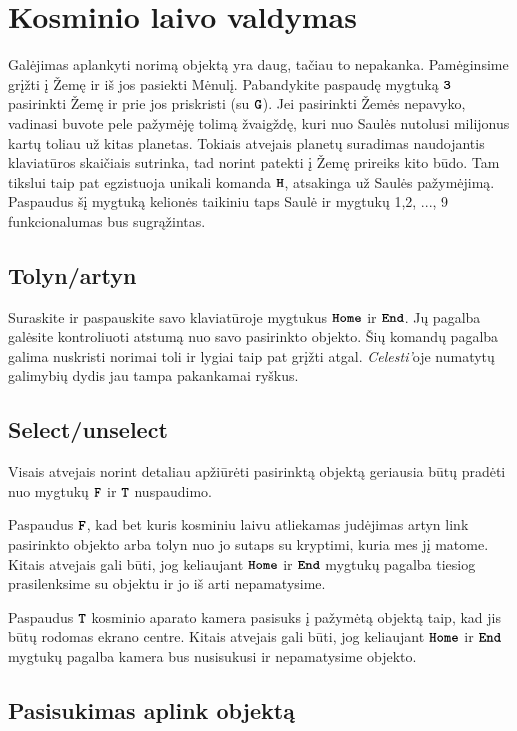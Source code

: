 \documentclass[a4paper]{article}
\begin{document}
\section*{Kosminio laivo valdymas}
Galėjimas aplankyti norimą objektą yra daug, tačiau to nepakanka. Pamėginsime grįžti į Žemę ir iš jos pasiekti Mėnulį. Pabandykite paspaudę mygtuką $\textbf{\texttt{3}}$ pasirinkti Žemę ir prie jos priskristi (su  $\textbf{\texttt{G}}$). Jei pasirinkti Žemės nepavyko, vadinasi buvote pele pažymėję tolimą žvaigždę, kuri nuo Saulės nutolusi milijonus kartų toliau už kitas planetas. Tokiais atvejais planetų suradimas naudojantis klaviatūros skaičiais sutrinka, tad norint patekti į Žemę prireiks kito būdo. Tam tikslui taip pat egzistuoja unikali komanda $\textbf{\texttt{H}}$, atsakinga už Saulės pažymėjimą. Paspaudus šį mygtuką kelionės taikiniu taps Saulė ir mygtukų 1,2, ..., 9 funkcionalumas bus sugrąžintas.
\subsection*{Tolyn/artyn}
Suraskite ir paspauskite savo klaviatūroje mygtukus $\textbf{\texttt{Home}}$ ir $\textbf{\texttt{End}}$. Jų pagalba galėsite kontroliuoti atstumą nuo savo pasirinkto objekto. Šių komandų pagalba galima nuskristi norimai toli ir lygiai taip pat grįžti atgal. \textit{Celesti'}oje numatytų galimybių dydis jau tampa pakankamai ryškus.
\subsection*{Select/unselect} 

Visais atvejais norint detaliau apžiūrėti pasirinktą objektą geriausia būtų pradėti nuo mygtukų $\textbf{\texttt{F}}$ ir $\textbf{\texttt{T}}$ nuspaudimo.

Paspaudus $\textbf{\texttt{F}}$, kad bet kuris kosminiu laivu atliekamas judėjimas artyn link pasirinkto objekto arba tolyn nuo jo sutaps su kryptimi, kuria mes jį matome. Kitais atvejais gali būti, jog keliaujant $\textbf{\texttt{Home}}$ ir $\textbf{\texttt{End}}$ mygtukų pagalba tiesiog prasilenksime su objektu ir jo iš arti nepamatysime.

Paspaudus $\textbf{\texttt{T}}$ kosminio aparato kamera pasisuks į pažymėtą objektą taip, kad jis būtų rodomas ekrano centre. Kitais atvejais gali būti, jog keliaujant $\textbf{\texttt{Home}}$ ir $\textbf{\texttt{End}}$ mygtukų pagalba kamera bus nusisukusi ir nepamatysime objekto.

\subsection*{Pasisukimas aplink objektą}
\end{document}
